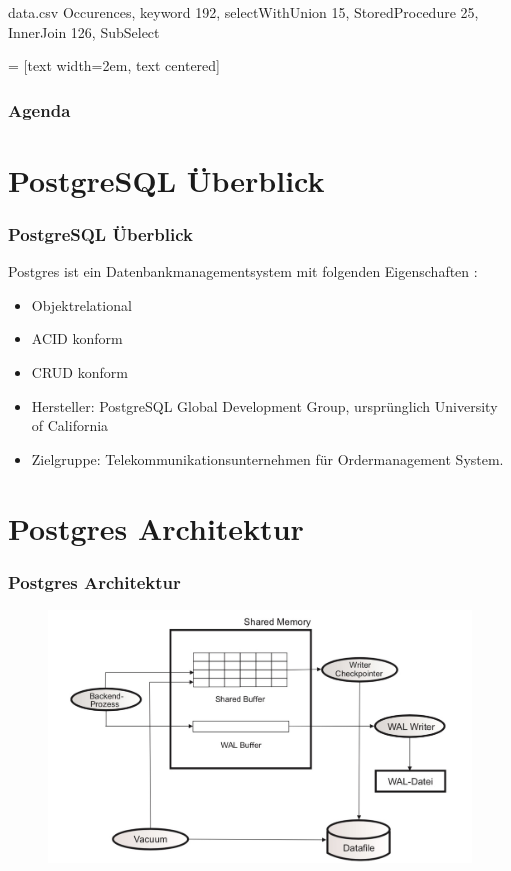 \documentclass[hyperref={pdfpagelabels=false}]{beamer}
\author{Jennifer Wittling, Rolf Kimmelmann, Jan Löffelsender}
\title{\tit}
\newcommand{\pu}{PostgreSQL Überblick}
\newcommand{\parcht}{Postgres Architektur}
\begin{document}
\begin{filecontents}{data.csv}
{Occurences}, {keyword}
192, selectWithUnion
15, StoredProcedure
25, InnerJoin
126, SubSelect
\end{filecontents}
 = [text width=2em, text centered]

\begin{frame}
\titlepage
\end{frame} 

\begin{frame}
\frametitle{Agenda}
\hypertarget{tableofcontent}{}
\tableofcontents
\end{frame} 

\section{PostgreSQL Überblick}
	\begin{frame}
		\frametitle{\pu}
		Postgres ist ein Datenbankmanagementsystem mit folgenden Eigenschaften :
		\begin{itemize}
			\item Objektrelational
			\item ACID konform
            \item CRUD konform
            \item Hersteller: PostgreSQL Global Development Group, ursprünglich University of California
            \item Zielgruppe: Telekommunikationsunternehmen für Ordermanagement System.
		\end{itemize}
	\end{frame}

\section{Postgres Architektur}
\begin{frame}
	\frametitle{\parcht}
	\centering
	\begin{figure}
		\includegraphics[scale=0.2]{../images/postgresArchitektur.jpg}
	\end{figure}
\end{frame}
\end{document}
